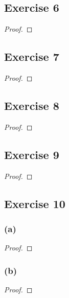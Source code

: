 \documentclass[14pt]{extarticle}
\begin{document}
\subsection{Exercise 6}

\begin{proof}

\end{proof}

\subsection{Exercise 7}

\begin{proof}

\end{proof}

\subsection{Exercise 8}

\begin{proof}

\end{proof}

\subsection{Exercise 9}

\begin{proof}

\end{proof}

\subsection{Exercise 10}

\subsubsection{(a)}

\begin{proof}

\end{proof}

\subsubsection{(b)}

\begin{proof}

\end{proof}
\end{document}
